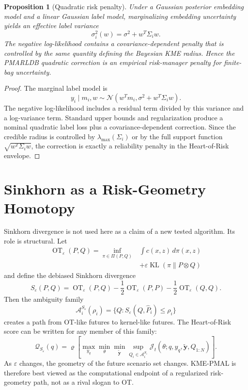 \documentclass[10pt,journal]{IEEEtran}
\newtheorem{proposition}{Proposition}
\DeclareMathOperator{\OT}{OT}
\DeclareMathOperator{\KL}{KL}
\newcommand{\Jcal}{\mathcal{J}}
\newcommand{\eps}{\varepsilon}
\newcommand{\risk}{\varrho}
\newcommand{\Qcal}{\mathcal{Q}}
\newcommand{\Acal}{\mathcal{A}}
\begin{document}
\begin{proposition}[Quadratic risk penalty]
\label{prop:quad-risk-v5}
Under a Gaussian posterior embedding model and a linear Gaussian label model, marginalizing embedding uncertainty yields an effective label variance
\begin{equation}
    \sigma_i^2(w)=\sigma^2+w^T\Sigma_iw.
\end{equation}
The negative log-likelihood contains a covariance-dependent penalty that is controlled by the same quantity defining the Bayesian KME radius. Hence the PMARLDB quadratic correction is an empirical risk-manager penalty for finite-bag uncertainty.
\end{proposition}

\begin{proof}
The marginal label model is
\begin{equation}
    y_i\mid m_i,w\sim \mathcal N(w^Tm_i,\sigma^2+w^T\Sigma_iw).
\end{equation}
The negative log-likelihood includes a residual term divided by this variance and a log-variance term. Standard upper bounds and regularization produce a nominal quadratic label loss plus a covariance-dependent correction. Since the credible radius is controlled by $\lambda_{\max}(\Sigma_i)$ or by the full support function $\sqrt{w^T\Sigma_iw}$, the correction is exactly a reliability penalty in the Heart-of-Risk envelope.
\end{proof}

\section{Sinkhorn as a Risk-Geometry Homotopy}
\label{sec:sinkhorn-v5}

Sinkhorn divergence is not used here as a claim of a new tested algorithm. Its role is structural. Let
\begin{equation}
\begin{aligned}
\OT_\eps(P,Q)
=\inf_{\pi\in\Pi(P,Q)}&\int c(x,z)\,d\pi(x,z)\\
&+\eps\KL(\pi\|P\otimes Q)
\end{aligned}
\end{equation}
and define the debiased Sinkhorn divergence
\begin{equation}
    S_\eps(P,Q)=\OT_\eps(P,Q)-\frac{1}{2}\OT_\eps(P,P)-\frac{1}{2}\OT_\eps(Q,Q).
\end{equation}
Then the ambiguity family
\begin{equation}
    \Acal_i^{S_\eps}(\rho_i)=\{Q:S_\eps(Q,\widehat P_i)\le \rho_i\}
\end{equation}
creates a path from OT-like futures to kernel-like futures. The Heart-of-Risk score can be written for any member of this family:
\begin{equation}
    \Qcal_{S_\eps}(q)=\risk\!\left[\max_{y_q}\min_\theta\min_{\tilde{\mathbf y}}
    \sup_{Q_i\in\Acal_i^{S_\eps}}\Jcal_t(\theta;q,y_q,\tilde{\mathbf y},Q_{1:N})\right].
\end{equation}
As $\eps$ changes, the geometry of the future scenario set changes. KME-PMAL is therefore best viewed as the computational endpoint of a regularized risk-geometry path, not as a rival slogan to OT.
\end{document}
